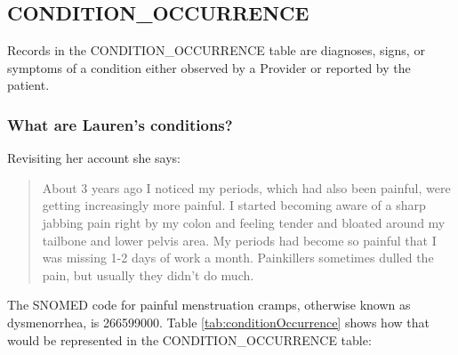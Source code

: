 \documentclass[11pt]{book}
\theoremstyle{definition}
\theoremstyle{definition}
\theoremstyle{definition}
\theoremstyle{remark}
\begin{document}
\hypertarget{conditionOccurrence}{%
\subsection{CONDITION\_OCCURRENCE}\label{conditionOccurrence}}

Records in the CONDITION\_OCCURRENCE table are diagnoses, signs, or symptoms of a condition either observed by a Provider or reported by the patient.

\hypertarget{what-are-laurens-conditions}{%
\subsubsection*{What are Lauren's conditions?}\label{what-are-laurens-conditions}}

Revisiting her account she says:

\begin{quote}
About 3 years ago I noticed my periods, which had also been painful, were getting increasingly more painful. I started becoming aware of a sharp jabbing pain right by my colon and feeling tender and bloated around my tailbone and lower pelvis area. My periods had become so painful that I was missing 1-2 days of work a month. Painkillers sometimes dulled the pain, but usually they didn't do much.
\end{quote}

The SNOMED code for painful menstruation cramps, otherwise known as dysmenorrhea, is 266599000. Table \ref{tab:conditionOccurrence} shows how that would be represented in the CONDITION\_OCCURRENCE table:
\end{document}
